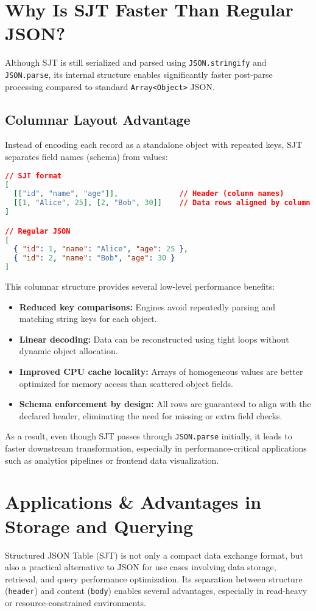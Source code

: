 \documentclass[12pt]{article}
\begin{document}
\clearpage
\section{Why Is SJT Faster Than Regular JSON?}
Although SJT is still serialized and parsed using \texttt{JSON.stringify} and \texttt{JSON.parse}, its internal structure enables significantly faster post-parse processing compared to standard \texttt{Array<Object>} JSON.

\subsection*{Columnar Layout Advantage}
Instead of encoding each record as a standalone object with repeated keys, SJT separates field names (schema) from values:

\begin{lstlisting}[language=json]
// SJT format
[
  [["id", "name", "age"]],              // Header (column names)
  [[1, "Alice", 25], [2, "Bob", 30]]    // Data rows aligned by column
]

// Regular JSON
[
  { "id": 1, "name": "Alice", "age": 25 },
  { "id": 2, "name": "Bob", "age": 30 }
]
\end{lstlisting}

This columnar structure provides several low-level performance benefits:

\begin{itemize}
  \item \textbf{Reduced key comparisons:} Engines avoid repeatedly parsing and matching string keys for each object.
  \item \textbf{Linear decoding:} Data can be reconstructed using tight loops without dynamic object allocation.
  \item \textbf{Improved CPU cache locality:} Arrays of homogeneous values are better optimized for memory access than scattered object fields.
  \item \textbf{Schema enforcement by design:} All rows are guaranteed to align with the declared header, eliminating the need for missing or extra field checks.
\end{itemize}

As a result, even though SJT passes through \texttt{JSON.parse} initially, it leads to faster downstream transformation, especially in performance-critical applications such as analytics pipelines or frontend data visualization.
\section{Applications \& Advantages in Storage and Querying}
Structured JSON Table (SJT) is not only a compact data exchange format, but also a practical alternative to JSON for use cases involving data storage, retrieval, and query performance optimization. Its separation between structure (\texttt{header}) and content (\texttt{body}) enables several advantages, especially in read-heavy or resource-constrained environments.
\end{document}
